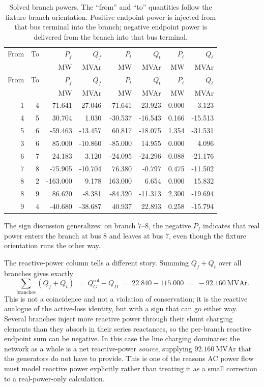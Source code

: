 \documentclass[11pt]{article}
\newcommand{\MVAr}{\mathrm{MVAr}}
\begin{document}
\begin{longtable}{@{}rrrrrrrr@{}}
\caption{Solved branch powers. The ``from'' and ``to'' quantities follow
the fixture branch orientation. Positive endpoint power is injected from
that bus terminal into the branch; negative endpoint power is delivered
from the branch into that bus terminal.}\label{tab:branch-flows}\\
\toprule
From & To & $P_f$ & $Q_f$ & $P_t$ & $Q_t$ & $P_{\ell}$ & $Q_{\ell}$ \\
 & & MW & MVAr & MW & MVAr & MW & MVAr \\
\midrule
\endfirsthead
\toprule
From & To & $P_f$ & $Q_f$ & $P_t$ & $Q_t$ & $P_{\ell}$ & $Q_{\ell}$ \\
 & & MW & MVAr & MW & MVAr & MW & MVAr \\
\midrule
\endhead
1 & 4 & 71.641 & 27.046 & -71.641 & -23.923 & 0.000 & 3.123 \\
4 & 5 & 30.704 & 1.030 & -30.537 & -16.543 & 0.166 & -15.513 \\
5 & 6 & -59.463 & -13.457 & 60.817 & -18.075 & 1.354 & -31.531 \\
3 & 6 & 85.000 & -10.860 & -85.000 & 14.955 & 0.000 & 4.096 \\
6 & 7 & 24.183 & 3.120 & -24.095 & -24.296 & 0.088 & -21.176 \\
7 & 8 & -75.905 & -10.704 & 76.380 & -0.797 & 0.475 & -11.502 \\
8 & 2 & -163.000 & 9.178 & 163.000 & 6.654 & 0.000 & 15.832 \\
8 & 9 & 86.620 & -8.381 & -84.320 & -11.313 & 2.300 & -19.694 \\
9 & 4 & -40.680 & -38.687 & 40.937 & 22.893 & 0.258 & -15.794 \\
\bottomrule
\end{longtable}

The sign discussion generalizes: on branch $7$--$8$, the negative $P_f$
indicates that real power enters the branch at bus 8 and leaves at bus
7, even though the fixture orientation runs the other way.

The reactive-power column tells a different story. Summing $Q_f + Q_t$
over all branches gives exactly
\[
  \sum_{\mathrm{branches}}(Q_f + Q_t) \;=\;
  Q_G^{\mathrm{sol}} - Q_D
  \;=\; 22.840 - 115.000 \;=\; -92.160~\MVAr.
\]
This is not a coincidence and not a violation of conservation; it is the
reactive analogue of the active-loss identity, but with a sign that can
go either way. Several branches inject more reactive power through their
shunt charging elements than they absorb in their series reactances, so
the per-branch reactive endpoint sum can be negative. In this case the
line charging dominates: the network as a whole is a net reactive-power
\emph{source}, supplying $92.160~\MVAr$ that the generators do not have
to provide. This is one of the reasons AC power flow must model
reactive power explicitly rather than treating it as a small correction
to a real-power-only calculation.
\end{document}
